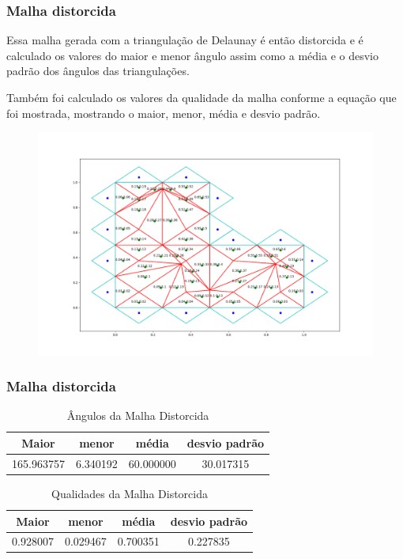 \documentclass{beamer}
\begin{document}
\begin{frame}
  \frametitle{Malha distorcida}

  Essa malha gerada com a triangulação de Delaunay é então distorcida e é calculado os valores do maior e menor ângulo assim como a média e o desvio padrão dos ângulos das triangulações.

  Também foi calculado os valores da qualidade da malha conforme a equação que foi mostrada, mostrando o maior, menor, média e desvio padrão.

  \begin{figure}
    \includegraphics[width=0.6\linewidth]{malha-ruim.png}
  \end{figure}

\end{frame}

\begin{frame}
  \frametitle{Malha distorcida}

  \begin{table}[hb]
    \centering
    \par\caption{Ângulos da Malha Distorcida}
    \begin{tabular}{c|c|c|c}
      Maior      & menor    & média     & desvio padrão \\\hline\hline
      165.963757 & 6.340192 & 60.000000 & 30.017315     \\\hline
    \end{tabular}
    \label{tab:angulos-malha-distorcida}
  \end{table}

  \begin{table}[hb]
    \centering
    \par\caption{Qualidades da Malha Distorcida}
    \begin{tabular}{c|c|c|c}
      Maior    & menor    & média    & desvio padrão \\\hline\hline
      0.928007 & 0.029467 & 0.700351 & 0.227835      \\\hline
    \end{tabular}
    \label{tab:qualidades-malha-distorcida}
  \end{table}

\end{frame}
\end{document}

